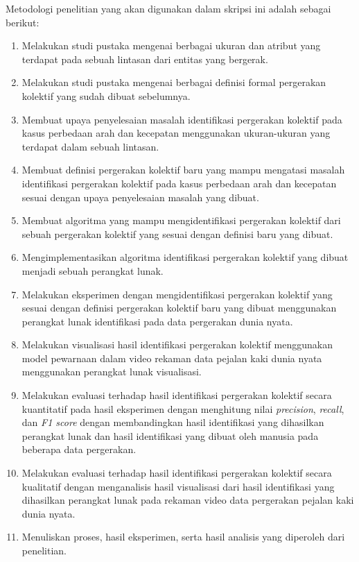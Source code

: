 Metodologi penelitian yang akan digunakan dalam skripsi ini adalah sebagai berikut:

\begin{enumerate}
    \item Melakukan studi pustaka mengenai berbagai ukuran dan atribut yang terdapat pada sebuah lintasan dari entitas yang bergerak.
    \item Melakukan studi pustaka mengenai berbagai definisi formal pergerakan kolektif yang sudah dibuat sebelumnya.
    \item Membuat upaya penyelesaian masalah identifikasi pergerakan kolektif pada kasus perbedaan arah dan kecepatan menggunakan ukuran-ukuran yang terdapat dalam sebuah lintasan.
    \item Membuat definisi pergerakan kolektif baru yang mampu mengatasi masalah identifikasi pergerakan kolektif pada kasus perbedaan arah dan kecepatan sesuai dengan upaya penyelesaian masalah yang dibuat.
    \item Membuat algoritma yang mampu mengidentifikasi pergerakan kolektif dari sebuah pergerakan kolektif yang sesuai dengan definisi baru yang dibuat.
    \item Mengimplementasikan algoritma identifikasi pergerakan kolektif yang dibuat menjadi sebuah perangkat lunak.
    \item Melakukan eksperimen dengan mengidentifikasi pergerakan kolektif yang sesuai dengan definisi pergerakan kolektif baru yang dibuat menggunakan perangkat lunak identifikasi pada data pergerakan dunia nyata.
    \item Melakukan visualisasi hasil identifikasi pergerakan kolektif menggunakan model pewarnaan dalam video rekaman data pejalan kaki dunia nyata menggunakan perangkat lunak visualisasi.
    \item Melakukan evaluasi terhadap hasil identifikasi pergerakan kolektif secara kuantitatif pada hasil eksperimen dengan menghitung nilai \textit{precision}, \textit{recall}, dan \textit{F1 score} dengan membandingkan hasil identifikasi yang dihasilkan perangkat lunak dan hasil identifikasi yang dibuat oleh manusia pada beberapa data pergerakan.
    \item Melakukan evaluasi terhadap hasil identifikasi pergerakan kolektif secara kualitatif dengan menganalisis hasil visualisasi dari hasil identifikasi yang dihasilkan perangkat lunak pada rekaman video data pergerakan pejalan kaki dunia nyata.
    \item Menuliskan proses, hasil eksperimen, serta hasil analisis yang diperoleh dari penelitian.
\end{enumerate}

